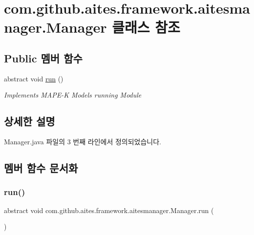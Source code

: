 \hypertarget{classcom_1_1github_1_1aites_1_1framework_1_1aitesmanager_1_1_manager}{}\section{com.\+github.\+aites.\+framework.\+aitesmanager.\+Manager 클래스 참조}
\label{classcom_1_1github_1_1aites_1_1framework_1_1aitesmanager_1_1_manager}
\subsection*{Public 멤버 함수}
\begin{DoxyCompactItemize}
\item 
abstract void \mbox{\hyperlink{classcom_1_1github_1_1aites_1_1framework_1_1aitesmanager_1_1_manager_a24ca858cff486ac12bb20508ee2c467a}{run}} ()
\begin{DoxyCompactList}\small\item\em Implements M\+A\+P\+E-\/K Models running Module \end{DoxyCompactList}\end{DoxyCompactItemize}


\subsection{상세한 설명}


Manager.\+java 파일의 3 번째 라인에서 정의되었습니다.



\subsection{멤버 함수 문서화}
\mbox{\label{classcom_1_1github_1_1aites_1_1framework_1_1aitesmanager_1_1_manager_a24ca858cff486ac12bb20508ee2c467a}} 
\subsubsection{\texorpdfstring{run()}{run()}}
{\footnotesize\ttfamily abstract void com.\+github.\+aites.\+framework.\+aitesmanager.\+Manager.\+run (\begin{DoxyParamCaption}{ }\end{DoxyParamCaption})\hspace{0.3cm}{\ttfamily [abstract]}}



